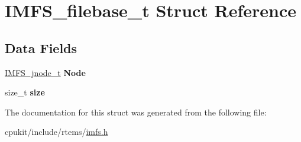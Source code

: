 \hypertarget{structIMFS__filebase__t}{}\section{I\+M\+F\+S\+\_\+filebase\+\_\+t Struct Reference}
\label{structIMFS__filebase__t}
\subsection*{Data Fields}
\begin{DoxyCompactItemize}
\item 
\mbox{\label{structIMFS__filebase__t_a9083a476375e858b816631e941c994c3}} 
\mbox{\hyperlink{structIMFS__jnode__tt}{I\+M\+F\+S\+\_\+jnode\+\_\+t}} {\bfseries Node}
\item 
\mbox{\label{structIMFS__filebase__t_abe565c90e5c8eb5434263fe56bfca420}} 
size\+\_\+t {\bfseries size}
\end{DoxyCompactItemize}


The documentation for this struct was generated from the following file\+:\begin{DoxyCompactItemize}
\item 
cpukit/include/rtems/\mbox{\hyperlink{imfs_8h}{imfs.\+h}}\end{DoxyCompactItemize}

